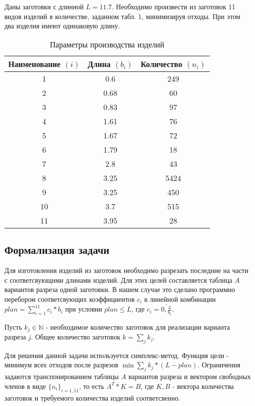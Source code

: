 \documentclass[../body.tex]{subfiles}
\begin{document}
Даны заготовки с длинной $L=11.7$. Необходимо произвести из заготовок 11 видов изделий в количестве, заданном табл. 1, минимизируя отходы. При этом два изделия имеют одинаковую длину.
\begin{table}[H]
    \centering
    \begin{tabular}{|c|c|c|}
        \hline
        Наименование $(i)$ & Длина $(b_i)$ & Количество $(n_i)$\\\hline
        1 & 0.6 & 249\\\hline
        2 & 0.68 & 60\\\hline
        3 & 0.83 & 97\\\hline
        4 & 1.61 & 76\\\hline
        5 & 1.67 & 72\\\hline
        6 & 1.79 & 18\\\hline
        7 & 2.8 & 43\\\hline
        8 & 3.25 & 5424\\\hline
        9 & 3.25 & 450\\\hline
        10 & 3.7 & 515\\\hline
        11 & 3.95 & 28\\\hline
    \end{tabular}
    \caption{Параметры производства изделий}
\end{table}

\subsection{Формализация задачи}
Для изготовления изделий из заготовок необходимо разрезать последние на части с соответсвующими длинами изделий. Для этих целей составляется таблица $A$ вариантов разреза одной заготовки. В нашем случае это сделано программно перебором соответсвующих коэффициентов $c_i$ в линейной комбинации $plan=\sum_{i=1}^{11}{c_i*b_i}$ при условии $plan\leq L$, где $c_i=\overline{0,\frac{L}{b_i}}$.

Пусть $k_j\in\mathbb{N}$ - необходимое количество заготовок для реализации варианта разреза $j$. Общее количество заготовок $k=\sum_j{k_j}$.

Для решения данной задачи используется симплекс-метод. Функция цели - минимум всех отходов после разрезов $\min\sum_j{k_j*(L-plan)}$. Ограничения задаются транспонированием таблицы $A$ вариантов разреза и вектором свободных членов в виде $\{n_i\}_{i=\overline{1,11}}$, то есть $A^T*K=B$, где $K,B$ - вектора количества заготовок и требуемого количества изделий соответсвенно.
\end{document}
